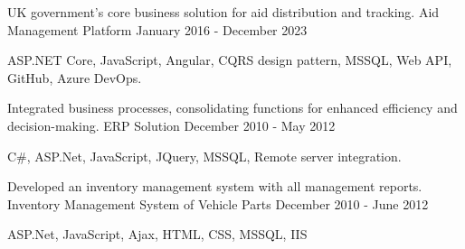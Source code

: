



\begin{cventries}


  \cventry
    {UK government's core business solution for aid distribution and tracking.} %
    {Aid Management Platform} %
    {January 2016 - December 2023} %
    {} %
    {
      \begin{cvitems} %
       \item {ASP.NET Core, JavaScript, Angular, CQRS design pattern, MSSQL, Web API, GitHub, Azure DevOps.}    
      \end{cvitems}
    }
    

  \cventry
    {Integrated business processes, consolidating functions for enhanced efficiency and decision-making.} %
    {ERP Solution} %
    {December 2010 - May 2012} %
    {} %
    {
      \begin{cvitems} %
       \item{C\#, ASP.Net, JavaScript, JQuery, MSSQL, Remote server integration.}
      \end{cvitems}
    }


  \cventry
    {Developed an inventory management system with all management reports.} %
    {Inventory Management System of Vehicle Parts} %
    { December 2010 - June 2012} %
    {} %
    {
      \begin{cvitems} %
        \item {ASP.Net, JavaScript, Ajax, HTML, CSS, MSSQL, IIS}        
      \end{cvitems}
    }
    


\end{cventries}
